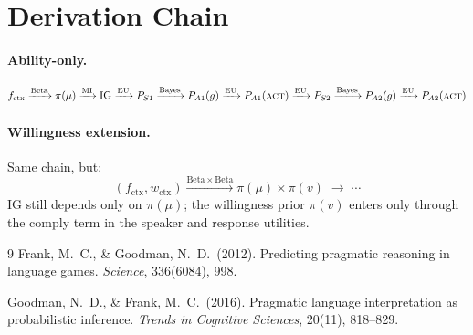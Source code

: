 \documentclass[11pt]{article}
\begin{document}
\section{Derivation Chain}

\paragraph{Ability-only.}
\[
  f_{\text{ctx}}
  \xrightarrow{\mathrm{Beta}}
  \pi(\mu)
  \xrightarrow{\mathrm{MI}}
  \mathrm{IG}
  \xrightarrow{\mathrm{EU}}
  P_{S1}
  \xrightarrow{\mathrm{Bayes}}
  P_{A1}(g)
  \xrightarrow{\mathrm{EU}}
  P_{A1}(\textsc{act})
  \xrightarrow{\mathrm{EU}}
  P_{S2}
  \xrightarrow{\mathrm{Bayes}}
  P_{A2}(g)
  \xrightarrow{\mathrm{EU}}
  P_{A2}(\textsc{act})
\]

\paragraph{Willingness extension.} Same chain, but:
\[
  (f_{\text{ctx}}, w_{\text{ctx}})
  \xrightarrow{\mathrm{Beta}\times\mathrm{Beta}}
  \pi(\mu)\times\pi(v)
  \;\longrightarrow\; \cdots
\]
IG still depends only on $\pi(\mu)$; the willingness prior $\pi(v)$ enters only
through the comply term in the speaker and response utilities.

\bigskip
\begin{thebibliography}{9}
Frank, M.\ C., \& Goodman, N.\ D.\ (2012).
Predicting pragmatic reasoning in language games.
\textit{Science}, 336(6084), 998.

Goodman, N.\ D., \& Frank, M.\ C.\ (2016).
Pragmatic language interpretation as probabilistic inference.
\textit{Trends in Cognitive Sciences}, 20(11), 818--829.

\end{thebibliography}
\end{document}
